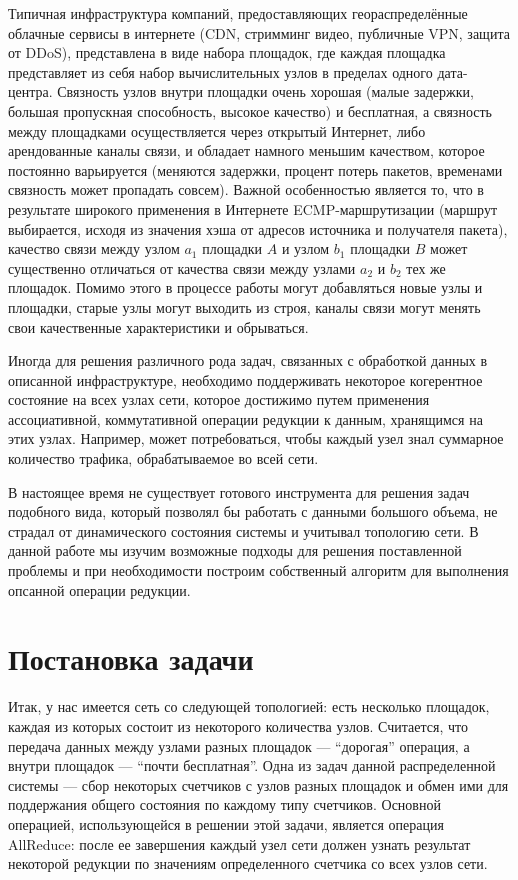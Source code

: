 \documentclass{article}
\theoremstyle{plain}
\theoremstyle{plain}
\theoremstyle{plain}
\theoremstyle{plain}
\theoremstyle{definition}
\theoremstyle{remark}
\theoremstyle{plain}
\begin{document}
Типичная инфраструктура компаний, предоставляющих геораспределённые облачные сервисы в интернете (CDN, стримминг видео, публичные VPN, защита от DDoS), представлена в виде набора площадок, где каждая площадка представляет из себя набор вычислительных узлов в пределах одного дата-центра. Связность узлов внутри площадки очень хорошая (малые задержки, большая пропускная способность, высокое качество) и бесплатная, а связность между площадками осуществляется через открытый Интернет, либо арендованные каналы связи, и обладает намного меньшим качеством, которое постоянно варьируется (меняются задержки, процент потерь пакетов, временами связность может пропадать совсем). Важной особенностью является то, что в результате широкого применения в Интернете ECMP-маршрутизации (маршрут выбирается, исходя из значения хэша от адресов источника и получателя пакета), качество связи между узлом $a_1$ площадки $A$ и узлом $b_1$ площадки $B$ может существенно отличаться от качества связи между узлами $a_2$ и $b_2$ тех же площадок. Помимо этого в процессе работы могут добавляться новые узлы и площадки, старые узлы могут выходить из строя, каналы связи могут менять свои качественные характеристики и обрываться.

Иногда для решения различного рода задач, связанных с обработкой данных в описанной инфраструктуре, необходимо поддерживать некоторое когерентное состояние на всех узлах сети, которое достижимо путем применения ассоциативной, коммутативной операции редукции к данным, хранящимся на этих узлах. Например, может потребоваться, чтобы каждый узел знал суммарное количество трафика, обрабатываемое во всей сети.

В настоящее время не существует готового инструмента для решения задач подобного вида, который позволял бы работать с данными большого объема, не страдал от динамического состояния системы и учитывал топологию сети. В данной работе мы изучим возможные подходы для решения поставленной проблемы и при необходимости построим собственный алгоритм для выполнения опсанной операции редукции.

\section{Постановка задачи}

Итак, у нас имеется сеть со следующей топологией: есть несколько площадок, каждая из которых состоит из некоторого количества узлов. Считается, что передача данных между узлами разных площадок — \enquote{дорогая} операция, а внутри площадок — \enquote{почти бесплатная}. Одна из задач данной распределенной системы — сбор некоторых счетчиков с узлов разных площадок и обмен ими для поддержания общего состояния по каждому типу счетчиков. Основной операцией, использующейся в решении этой задачи, является операция AllReduce: после ее завершения каждый узел сети должен узнать результат некоторой редукции по значениям определенного счетчика со всех узлов сети.
\end{document}
